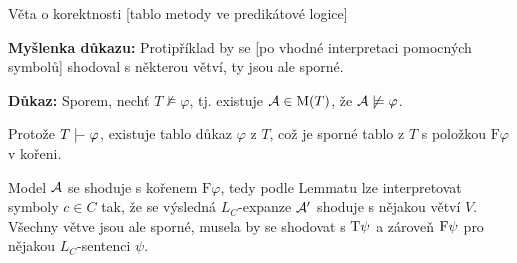 \documentclass{beamer}
\begin{document}
\begin{frame}{Věta o korektnosti [tablo metody ve predikátové logice]}

    \pause

    \medskip

    \pause
    \textbf{Myšlenka důkazu:} Protipříklad by se [po vhodné interpretaci pomocných symbolů] shodoval s některou větví, ty jsou ale sporné.

    \medskip

    \pause
    \textbf{Důkaz:} \pause Sporem, nechť $T\not\models\varphi$, tj. existuje $\mathcal{A}\in\operatorname{M}(T)$, že $\mathcal{A}\not\models\varphi$.
    
    \pause
    Protože $T\proves\varphi$, existuje tablo důkaz $\varphi$ z $T$, což je sporné tablo z $T$ s položkou $\mathrm{F}\varphi$ v kořeni. 
        
    \pause
    Model $\mathcal{A}$ se shoduje s kořenem $\mathrm{F}\varphi$, tedy podle Lemmatu lze interpretovat symboly $c\in C$ tak, že se výsledná $L_C$-expanze $\mathcal{A}'$ shoduje s nějakou větví $V$. \pause Všechny větve jsou ale sporné, musela by se shodovat s $\mathrm{T}\psi$ a zároveň $\mathrm{F}\psi$ pro nějakou $L_C$-sentenci $\psi$.\hfill\qedsymbol

\end{frame}
\end{document}
